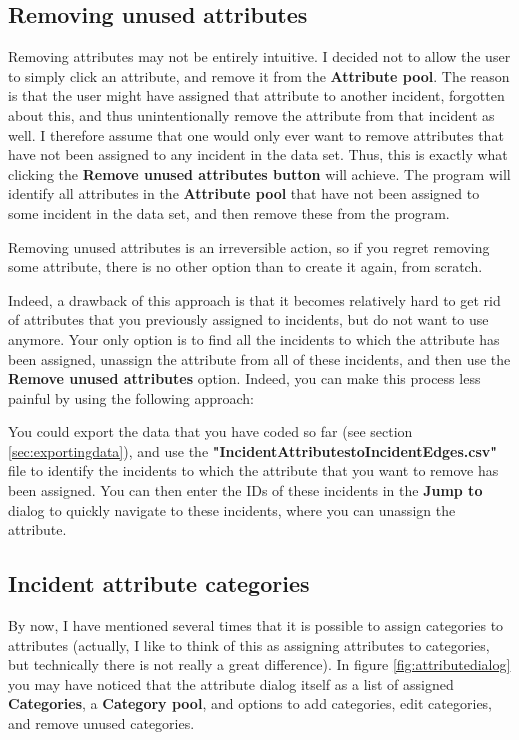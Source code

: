 \documentclass{memoir}
\begin{document}
\subsection{Removing unused attributes}
\label{sec:removingattributes}

Removing attributes may not be entirely intuitive. I decided not to allow the user to simply click an attribute, and remove it from the \textbf{Attribute pool}. The reason is that the user might have assigned that attribute to another incident, forgotten about this, and thus unintentionally remove the attribute from that incident as well. I therefore assume that one would only ever want to remove attributes that have not been assigned to any incident in the data set. Thus, this is exactly what clicking the \textbf{Remove unused attributes button} will achieve. The program will identify all attributes in the \textbf{Attribute pool} that have not been assigned to some incident in the data set, and then remove these from the program.

Removing unused attributes is an irreversible action, so if you regret removing some attribute, there is no other option than to create it again, from scratch.

Indeed, a drawback of this approach is that it becomes relatively hard to get rid of attributes that you previously assigned to incidents, but do not want to use anymore. Your only option is to find all the incidents to which the attribute has been assigned, unassign the attribute from all of these incidents, and then use the \textbf{Remove unused attributes} option. Indeed, you can make this process less painful by using the following approach:

You could export the data that you have coded so far (see section \ref{sec:exportingdata}), and use the \textbf{"Incident\textunderscore Attributes\textunderscore to\textunderscore Incident\textunderscore Edges.csv"} file to identify the incidents to which the attribute that you want to remove has been assigned. You can then enter the IDs of these incidents in the \textbf{Jump to} dialog to quickly navigate to these incidents, where you can unassign the attribute.


\subsection{Incident attribute categories}
\label{sec:incidentattributecategories}

By now, I have mentioned several times that it is possible to assign categories to attributes (actually, I like to think of this as assigning attributes to categories, but technically there is not really a great difference). In figure \ref{fig:attributedialog} you may have noticed that the attribute dialog itself as a list of assigned \textbf{Categories}, a \textbf{Category pool}, and options to add categories, edit categories, and remove unused categories.
\end{document}
